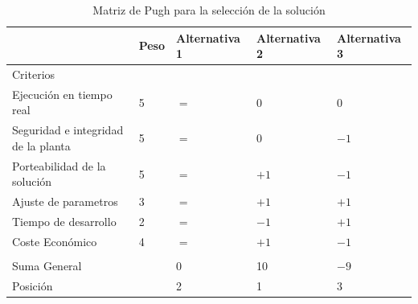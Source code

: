 \documentclass[12pt]{article}
\begin{document}
\begin{table}[!h]
  \centering
  \caption{Matriz de Pugh para la selección de la solución}
  \label{tab:pugh}
  \begin{tabular}{lllll}
  \cline{2-5}
  \multicolumn{1}{l|}{}                                                       & \multicolumn{1}{l|}{\cellcolor[HTML]{DAE8FC}Peso}   & \multicolumn{1}{l|}{\cellcolor[HTML]{DAE8FC}Alternativa 1} & \multicolumn{1}{l|}{\cellcolor[HTML]{DAE8FC}Alternativa 2} & \multicolumn{1}{l|}{\cellcolor[HTML]{DAE8FC}Alternativa 3} \\ \hline
  \multicolumn{1}{|l|}{\cellcolor[HTML]{DAE8FC}Criterios}                     & \multicolumn{1}{l|}{\cellcolor[HTML]{CBCEFB}}      & \multicolumn{1}{l|}{} & \multicolumn{1}{l|}{} & \multicolumn{1}{l|}{} \\ \hline
  \multicolumn{1}{|l|}{\cellcolor[HTML]{DAE8FC}Ejecución en tiempo real}      & \multicolumn{1}{l|}{\cellcolor[HTML]{CBCEFB}5}      & \multicolumn{1}{l|}{$=$} & \multicolumn{1}{l|}{0} & \multicolumn{1}{l|}{0} \\ \hline
  \multicolumn{1}{|l|}{\cellcolor[HTML]{DAE8FC}Seguridad e integridad de la planta} & \multicolumn{1}{l|}{\cellcolor[HTML]{CBCEFB}5} & \multicolumn{1}{l|}{$=$} & \multicolumn{1}{l|}{0} & \multicolumn{1}{l|}{$-1$} \\ \hline
  \multicolumn{1}{|l|}{\cellcolor[HTML]{DAE8FC}Porteabilidad de la solución}  & \multicolumn{1}{l|}{\cellcolor[HTML]{CBCEFB}5}      & \multicolumn{1}{l|}{$=$} & \multicolumn{1}{l|}{$+1$} & \multicolumn{1}{l|}{$-1$} \\ \hline
  \multicolumn{1}{|l|}{\cellcolor[HTML]{DAE8FC}Ajuste de parametros}          & \multicolumn{1}{l|}{\cellcolor[HTML]{CBCEFB}3}      & \multicolumn{1}{l|}{$=$} & \multicolumn{1}{l|}{$+1$} & \multicolumn{1}{l|}{$+1$} \\ \hline
  \multicolumn{1}{|l|}{\cellcolor[HTML]{DAE8FC}Tiempo de desarrollo}          & \multicolumn{1}{l|}{\cellcolor[HTML]{CBCEFB}2}      & \multicolumn{1}{l|}{$=$} & \multicolumn{1}{l|}{$-1$} & \multicolumn{1}{l|}{$+1$} \\ \hline
  \multicolumn{1}{|l|}{\cellcolor[HTML]{DAE8FC}Coste Económico}               & \multicolumn{1}{l|}{\cellcolor[HTML]{CBCEFB}4}      & \multicolumn{1}{l|}{$=$} & \multicolumn{1}{l|}{$+1$} & \multicolumn{1}{l|}{$-1$} \\ \hline
   &  &  &  &  \\ \cline{1-1} \cline{3-5} 
  \multicolumn{1}{|l|}{\cellcolor[HTML]{DAE8FC}Suma General} & \multicolumn{1}{l|}{} & \multicolumn{1}{l|}{0} & \multicolumn{1}{l|}{10} & \multicolumn{1}{l|}{$-9$} \\ \cline{1-1} \cline{3-5} 
  \multicolumn{1}{|l|}{\cellcolor[HTML]{DAE8FC}Posición} & \multicolumn{1}{l|}{} & \multicolumn{1}{l|}{2} & \multicolumn{1}{l|}{1} & \multicolumn{1}{l|}{3} \\ \cline{1-1} \cline{3-5} 
  \end{tabular}
  \end{table}
\end{document}
